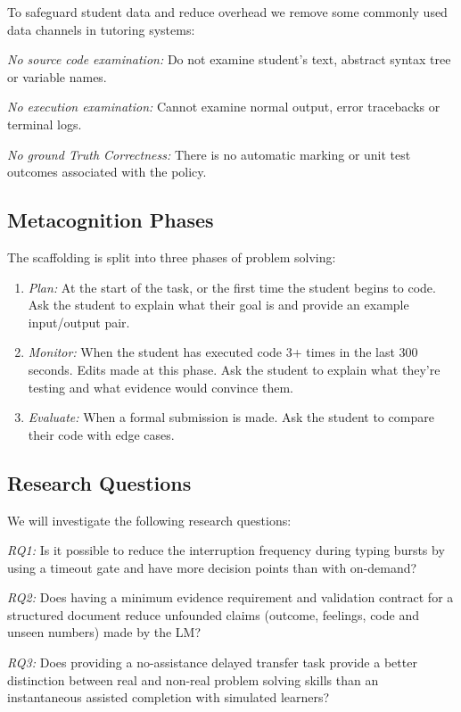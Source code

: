 \documentclass[conference]{IEEEtran}
\begin{document}
To safeguard student data and reduce overhead we remove some commonly used data channels in tutoring systems:

\textit{No source code examination:} Do not examine student's text, abstract syntax tree or variable names.

\textit{No execution examination:} Cannot examine normal output, error tracebacks or terminal logs.

\textit{No ground Truth Correctness:} There is no automatic marking or unit test outcomes associated with the policy.

\subsection{Metacognition Phases}

The scaffolding is split into three phases of problem solving:

\begin{enumerate}
\item[1)] \textit{Plan:} At the start of the task, or the first time the student begins to code. Ask the student to explain what their goal is and provide an example input/output pair.

\item[2)] \textit{Monitor:} When the student has executed code 3+ times in the last 300 seconds. Edits made at this phase. Ask the student to explain what they're testing and what evidence would convince them.

\item[3)] \textit{Evaluate:} When a formal submission is made. Ask the student to compare their code with edge cases.
\end{enumerate}

\subsection{Research Questions}

We will investigate the following research questions:

\textit{RQ1:} Is it possible to reduce the interruption frequency during typing bursts by using a timeout gate and have more decision points than with on-demand?

\textit{RQ2:} Does having a minimum evidence requirement and validation contract for a structured document reduce unfounded claims (outcome, feelings, code and unseen numbers) made by the LM?

\textit{RQ3:} Does providing a no-assistance delayed transfer task provide a better distinction between real and non-real problem solving skills than an instantaneous assisted completion with simulated learners?
\end{document}
